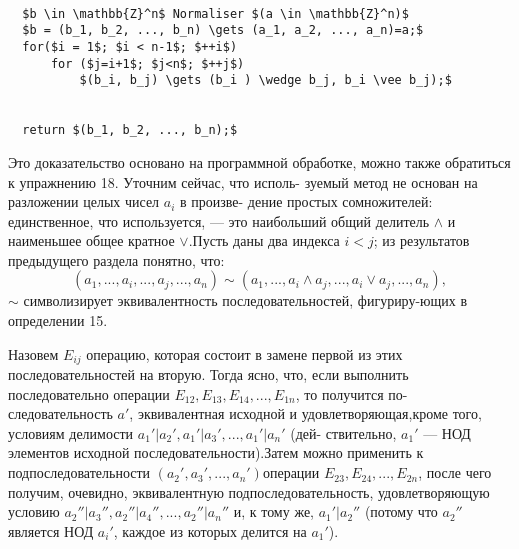 \begin{lstlisting}[mathescape=true]

  $b \in \mathbb{Z}^n$ Normaliser $(a \in \mathbb{Z}^n)$
  $b = (b_1, b_2, ..., b_n) \gets (a_1, a_2, ..., a_n)=a;$
  for($i = 1$; $i < n-1$; $++i$)
      for ($j=i+1$; $j<n$; $++j$)
          $(b_i, b_j) \gets (b_i ) \wedge b_j, b_i \vee b_j);$
      

  return $(b_1, b_2, ..., b_n);$

\end{lstlisting}
\begin{myproof}\linebreak
Это доказательство основано на программной обработке, можно \linebreak также обратиться к упражнению 18. Уточним сейчас, что исполь- \linebreak зуемый метод не основан на разложении целых чисел $a_i$ в произве- \linebreak дение простых сомножителей: единственное, что используется, --- \linebreak это наибольший общий делитель $\wedge$ и наименьшее общее кратное $\vee$.\linebreak Пусть даны два индекса $i < j$; из результатов предыдущего раздела \linebreak понятно, что:  
$$(a_1,...,a_i,...,a_j,...,a_n) \sim (a_1,...,a_i \wedge a_j,...,a_i \vee a_j,...,a_n),$$
$\sim$ символизирует эквивалентность последовательностей, фигуриру-\linebreak ющих в определении 15.  

\noindent Назовем $E_{ij}$ операцию, которая состоит в замене первой из этих \linebreak последовательностей на вторую. Тогда ясно, что, если выполнить \linebreak последовательно операции $E_{12}, E_{13}, E_{14}, ..., E_{1n}$, то получится по- \linebreak следовательность $a'$, эквивалентная исходной и удовлетворяющая,\linebreak кроме того, условиям делимости $a_1'|a_2', a_1'|a_3', ..., a_1'|a_n'$ (дей- \linebreak ствительно, $a_1'$ --- НОД элементов исходной последовательности).\linebreak Затем можно применить к подпоследовательности $(a_2', a_3',..., a_n')$\linebreak операции $E_{23}, E_{24}, ..., E_{2n}$, после чего получим, очевидно, \linebreak эквивалентную подпоследовательность, удовлетворяющую условию \linebreak $a_2''|a_3'', a_2''|a_4'', ..., a_2''|a_n''$ и, к тому же, $a_1'|a_2''$ (потому что $a_2''$ \linebreak является НОД $a_i'$, каждое из которых делится на $a_1'$).  \newpage


\end{myproof}
